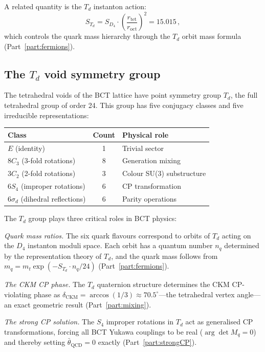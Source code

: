 \documentclass[review,number,sort&compress]{elsarticle}
\newcommand{\roct}{r_{\mathrm{oct}}}
\newcommand{\rtet}{r_{\mathrm{tet}}}
\newcommand{\SD}{S_{D_4}}
\newcommand{\STd}{S_{T_d}}
\newcommand{\Td}{T_d}
\newcommand{\Dfour}{D_4}
\begin{document}
A related quantity is the $\Td$ instanton action:
\begin{equation}
  \STd = \SD \cdot \left(\frac{\rtet}{\roct}\right)^{\!2} = 15.015\,,
  \label{eq:STd}
\end{equation}
which controls the quark mass hierarchy through the $\Td$ orbit mass
formula (Part~\ref{part:fermions}).

\subsection{The $\Td$ void symmetry group}
\label{sec:Td}

The tetrahedral voids of the BCT lattice have point symmetry group
$\Td$, the full tetrahedral group of order 24. This group has five
conjugacy classes and five irreducible representations:

\begin{center}
\begin{tabular}{@{}lcl@{}}
\toprule
Class & Count & Physical role \\
\midrule
$E$ (identity) & 1 & Trivial sector \\
$8C_3$ (3-fold rotations) & 8 & Generation mixing \\
$3C_2$ (2-fold rotations) & 3 & Colour SU(3) substructure \\
$6S_4$ (improper rotations) & 6 & CP transformation \\
$6\sigma_d$ (dihedral reflections) & 6 & Parity operations \\
\bottomrule
\end{tabular}
\end{center}

The $\Td$ group plays three critical roles in BCT physics:

\textit{Quark mass ratios.} The six quark flavours correspond to orbits
of $\Td$ acting on the $\Dfour$ instanton moduli space. Each orbit has a
quantum number $n_q$ determined by the representation theory of $\Td$,
and the quark mass follows from
$m_q = m_t \exp(-\STd \cdot n_q/24)$
(Part~\ref{part:fermions}).

\textit{The CKM CP phase.} The $\Td$ quaternion structure determines the
CKM CP-violating phase as
$\delta_{\mathrm{CKM}} = \arccos(1/3) \approx 70.5^\circ$---the
tetrahedral vertex angle---an exact geometric result
(Part~\ref{part:mixing}).

\textit{The strong CP solution.} The $S_4$ improper rotations in $\Td$
act as generalised CP transformations, forcing all BCT Yukawa couplings
to be real ($\arg\det M_q = 0$) and thereby setting
$\bar{\theta}_{\mathrm{QCD}} = 0$ exactly
(Part~\ref{part:strongCP}).
\end{document}
